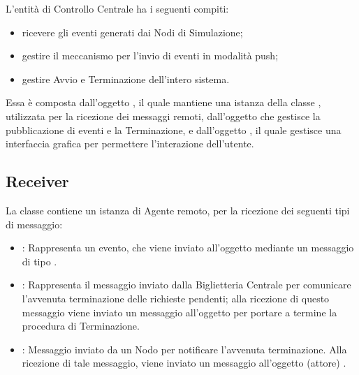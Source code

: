 	L'entità di Controllo Centrale ha i seguenti compiti:
	
	\begin{itemize}
		\item ricevere gli eventi generati dai Nodi di Simulazione;
		\item gestire il meccanismo  per l'invio di eventi in modalità push;
		\item gestire Avvio e Terminazione dell'intero sistema.
	\end{itemize}
	
	Essa è composta dall'oggetto , il quale mantiene una istanza della classe , utilizzata per la ricezione dei messaggi remoti, dall'oggetto   che gestisce la pubblicazione di eventi e la Terminazione, e dall'oggetto  , il quale gestisce una interfaccia grafica per permettere l'interazione dell'utente.
	
	\subsection{Receiver}
	La classe  contiene un istanza di Agente remoto, per la ricezione dei seguenti tipi di messaggio:
	\begin{itemize}
		\item {}: Rappresenta un evento, che viene inviato all'oggetto  mediante un messaggio di tipo .
		\item {}: Rappresenta il messaggio inviato dalla Biglietteria Centrale per comunicare l'avvenuta terminazione delle richieste pendenti; alla ricezione di questo messaggio viene inviato un messaggio  all'oggetto  per portare a termine la procedura di Terminazione.
		\item {}: Messaggio inviato da un Nodo per notificare l'avvenuta terminazione. Alla ricezione di tale messaggio, viene inviato un messaggio  all'oggetto (attore) .
	\end{itemize}
	
